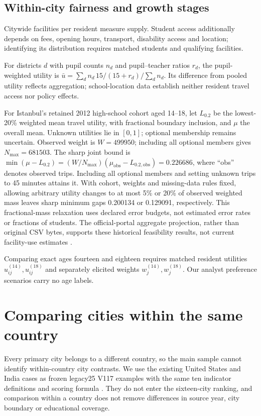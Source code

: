 \subsection{Within-city fairness and growth stages}
Citywide facilities per resident measure supply. Student access additionally
depends on fees, opening hours, transport, disability access and location;
identifying its distribution requires matched students and qualifying facilities.

\EquityCase
For districts $d$ with pupil counts $n_d$ and pupil--teacher ratios $r_d$,
the pupil-weighted utility is
$\bar u=\sum_d n_d\,15/(15+r_d)/\sum_dn_d$.
Its difference from pooled utility reflects aggregation; school-location data
establish neither resident travel access nor policy effects.

For Istanbul's retained 2012 high-school cohort aged 14--18, let $L_{0.2}$
be the lowest-20\% weighted mean travel utility, with fractional boundary
inclusion, and $\mu$ the overall mean. Unknown utilities lie in $[0,1]$; optional membership remains uncertain. Observed weight is $W=499950$; including all
optional members gives $N_{\max}=681503$. The sharp joint bound is
$\min(\mu-L_{0.2})=(W/N_{\max})(\mu_{\mathrm{obs}}-L_{0.2,\mathrm{obs}})=0.226686$,
where ``obs'' denotes observed trips.
Including all optional members and setting unknown trips to 45 minutes attains it.
With cohort, weights and missing-data rules fixed, allowing arbitrary utility
changes to at most 5\% or 20\% of observed weighted mass leaves sharp minimum gaps
0.200134 or 0.129091, respectively. This fractional-mass relaxation uses declared
error budgets, not estimated error rates or fractions of students.
The official-portal aggregate projection, rather than original CSV bytes,
supports these historical feasibility results, not current facility-use estimates
\cite{istanbul}.

\AgeCase



Comparing exact ages fourteen and eighteen requires matched resident utilities
$u_{ij}^{(14)},u_{ij}^{(18)}$ and separately elicited weights
$w_j^{(14)},w_j^{(18)}$. Our analyst preference scenarios carry no age labels.

\section{Comparing cities within the same country}
Every primary city belongs to a different country, so the main sample cannot
identify within-country city contrasts. We use the existing United States and
India cases as frozen legacy25 V117 examples with the same ten indicator
definitions and scoring formula \cite{legacycase}. They do not enter the sixteen-city ranking,
and comparison within a country does not remove differences in source year,
city boundary or educational coverage.

